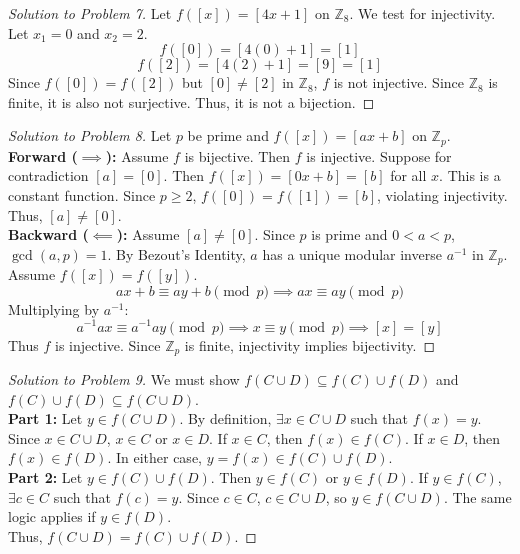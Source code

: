\documentclass[11pt, letterpaper]{article}
\theoremstyle{definition}
\theoremstyle{remark}
\newcommand{\Z}{\mathbb{Z}}
\begin{document}
\begin{proof}[Solution to Problem 7]
Let $f([x]) = [4x + 1]$ on $\Z_8$. We test for injectivity. Let $x_1 = 0$ and $x_2 = 2$.
\[ f([0]) = [4(0) + 1] = [1] \]
\[ f([2]) = [4(2) + 1] = [9] = [1] \]
Since $f([0]) = f([2])$ but $[0] \neq [2]$ in $\Z_8$, $f$ is not injective. Since $\Z_8$ is finite, it is also not surjective. Thus, it is not a bijection.
\end{proof}

\begin{proof}[Solution to Problem 8]
Let $p$ be prime and $f([x]) = [ax+b]$ on $\Z_p$. \\
\textbf{Forward ($\implies$):} Assume $f$ is bijective. Then $f$ is injective. Suppose for contradiction $[a] = [0]$. Then $f([x]) = [0x + b] = [b]$ for all $x$. This is a constant function. Since $p \ge 2$, $f([0]) = f([1]) = [b]$, violating injectivity. Thus, $[a] \neq [0]$. \\
\textbf{Backward ($\impliedby$):} Assume $[a] \neq [0]$. Since $p$ is prime and $0 < a < p$, $\gcd(a, p) = 1$. By Bezout's Identity, $a$ has a unique modular inverse $a^{-1}$ in $\Z_p$. Assume $f([x]) = f([y])$.
\[ ax + b \equiv ay + b \pmod p \implies ax \equiv ay \pmod p \]
Multiplying by $a^{-1}$:
\[ a^{-1}ax \equiv a^{-1}ay \pmod p \implies x \equiv y \pmod p \implies [x] = [y] \]
Thus $f$ is injective. Since $\Z_p$ is finite, injectivity implies bijectivity.
\end{proof}

\begin{proof}[Solution to Problem 9]
We must show $f(C \cup D) \subseteq f(C) \cup f(D)$ and $f(C) \cup f(D) \subseteq f(C \cup D)$. \\
\textbf{Part 1:} Let $y \in f(C \cup D)$. By definition, $\exists x \in C \cup D$ such that $f(x) = y$. Since $x \in C \cup D$, $x \in C$ or $x \in D$. If $x \in C$, then $f(x) \in f(C)$. If $x \in D$, then $f(x) \in f(D)$. In either case, $y = f(x) \in f(C) \cup f(D)$. \\
\textbf{Part 2:} Let $y \in f(C) \cup f(D)$. Then $y \in f(C)$ or $y \in f(D)$. If $y \in f(C)$, $\exists c \in C$ such that $f(c) = y$. Since $c \in C$, $c \in C \cup D$, so $y \in f(C \cup D)$. The same logic applies if $y \in f(D)$. \\
Thus, $f(C \cup D) = f(C) \cup f(D)$.
\end{proof}
\end{document}
